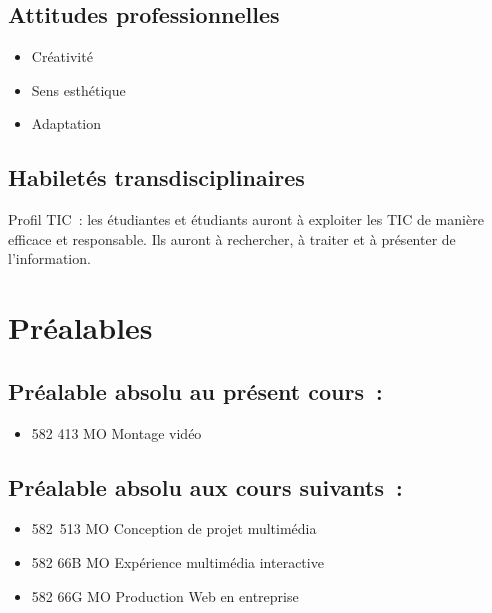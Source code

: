\documentclass[
]{book}
\providecommand{\tightlist}{%
  \setlength{\itemsep}{0pt}\setlength{\parskip}{0pt}}
\begin{document}
\hypertarget{attitudes-professionnelles}{%
\subsection{Attitudes professionnelles}\label{attitudes-professionnelles}}

\begin{itemize}
\tightlist
\item
  Créativité
\item
  Sens esthétique
\item
  Adaptation
\end{itemize}

\hypertarget{habiletuxe9s-transdisciplinaires}{%
\subsection{Habiletés transdisciplinaires}\label{habiletuxe9s-transdisciplinaires}}

Profil TIC~: les étudiantes et étudiants auront à exploiter les TIC de manière efficace et responsable. Ils auront à rechercher, à traiter et à présenter de l'information.

\hypertarget{pruxe9alables}{%
\section{Préalables}\label{pruxe9alables}}

\hypertarget{pruxe9alable-absolu-au-pruxe9sent-cours}{%
\subsection{Préalable absolu au présent cours~:}\label{pruxe9alable-absolu-au-pruxe9sent-cours}}

\begin{itemize}
\tightlist
\item
  582 413 MO Montage vidéo
\end{itemize}

\hypertarget{pruxe9alable-absolu-aux-cours-suivants}{%
\subsection{Préalable absolu aux cours suivants~:}\label{pruxe9alable-absolu-aux-cours-suivants}}

\begin{itemize}
\tightlist
\item
  582~513 MO Conception de projet multimédia
\item
  582 66B MO Expérience multimédia interactive
\item
  582 66G MO Production Web en entreprise
\end{itemize}
\end{document}
